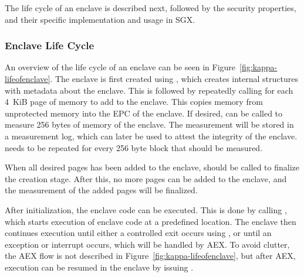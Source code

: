 The life cycle of an enclave is described next, followed by the security properties, and their specific implementation and usage in SGX.

\subsubsection{Enclave Life Cycle}

An overview of the life cycle of an enclave can be seen in Figure~\ref{fig:kappa-lifeofenclave}.
The enclave is first created using \sgxcreate{}, which creates internal structures with metadata about the enclave.
This is followed by repeatedly calling \sgxadd{} for each 4~KiB page of memory to add to the enclave.
This copies memory from unprotected memory into the EPC of the enclave.
If desired, \sgxextend{} can be called to measure 256 bytes of memory of the enclave.
The measurement will be stored in a measurement log, which can later be used to attest the integrity of the enclave.
\sgxextend{} needs to be repeated for every 256 byte block that should be measured.

When all desired pages has been added to the enclave, \sgxinit{} should be called to finalize the creation stage.
After this, no more pages can be added to the enclave, and the measurement of the added pages will be finalized.

After initialization, the enclave code can be executed.
This is done by calling \sgxenter{}, which starts execution of enclave code at a predefined location.
The enclave then continues execution until either a controlled exit occurs using \sgxexit{}, or until an exception or interrupt occurs, which will be handled by AEX.
To avoid clutter, the AEX flow is not described in Figure~\ref{fig:kappa-lifeofenclave}, but after AEX, execution can be resumed in the enclave by issuing \sgxresume{}.


